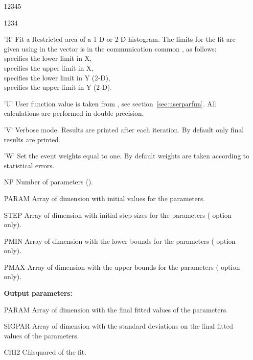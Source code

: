\begin{DLtt}{12345}
\begin{DLtt}{1234}
\item['R'] Fit a Restricted area of a 1-D or 2-D histogram.
           The limits for the fit are given using in the vector  
           is in the communication common , as follows:\\
%
            specifies the lower limit in X,\\
            specifies the upper limit in X,\\
            specifies the lower limit in Y (2-D),\\
            specifies the upper limit in Y (2-D).
\item['U'] User function value is taken from ,
%
           see section~\ref{sec:userparfun}.
           All calculations are performed in double precision.
\item['V'] Verbose mode.
           Results are printed after each iteration.
           By default only final results are printed.
\item['W'] Set the event weights equal to one.
           By default weights are taken according to statistical errors.
\end{DLtt}
\item[NP]  Number of parameters ().
\item[PARAM] Array of dimension  with initial values for
      the parameters.
\item[STEP] Array of dimension  with initial step sizes
      for the parameters ( option only).
\item[PMIN] Array of dimension  with the lower bounds
      for the parameters ( option only).
\item[PMAX] Array of dimension  with the upper bounds
      for the parameters ( option only).
\item[{\rm\bf Output parameters:}]
\item[PARAM] Array of dimension  with the final fitted values
      of the parameters.
\item[SIGPAR] Array of dimension  with the standard deviations
      on the final fitted values of the parameters.
\item[CHI2] Chisquared of the fit.
\end{DLtt}
 
